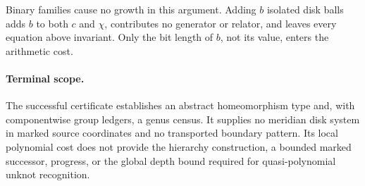 Binary families cause no growth in this argument.  Adding $b$ isolated
disk balls adds $b$ to both $c$ and $\chi$, contributes no generator or
relator, and leaves every equation above invariant.  Only the bit length
of $b$, not its value, enters the arithmetic cost.

\paragraph{Terminal scope.}
The successful certificate establishes an abstract homeomorphism type
and, with componentwise group ledgers, a genus census.  It supplies no
meridian disk system in marked source coordinates and no transported
boundary pattern.  Its local polynomial cost does not provide the
hierarchy construction, a bounded marked successor, progress, or the
global depth bound required for quasi-polynomial unknot recognition.

